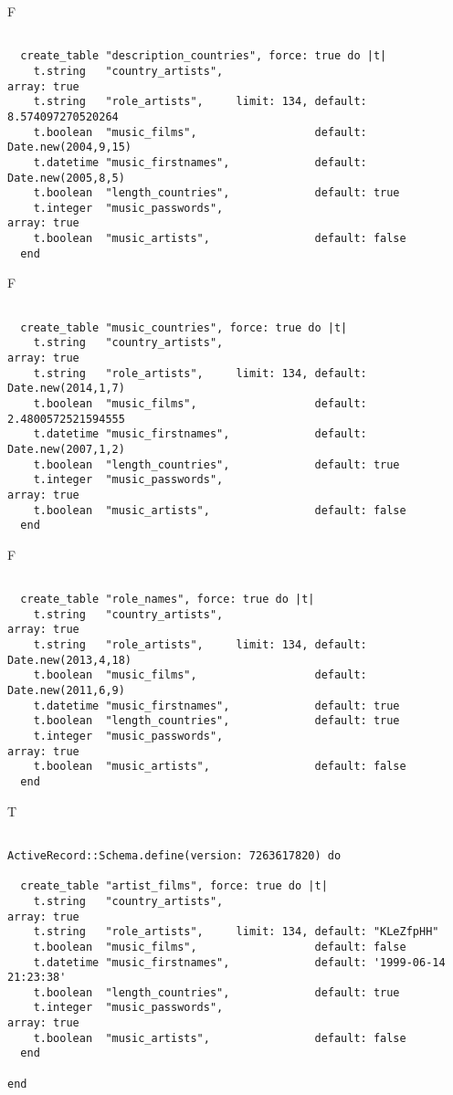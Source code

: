 F
\begin{verbatim}

  create_table "description_countries", force: true do |t|
    t.string   "country_artists",                                              array: true
    t.string   "role_artists",     limit: 134, default: 8.574097270520264
    t.boolean  "music_films",                  default: Date.new(2004,9,15)
    t.datetime "music_firstnames",             default: Date.new(2005,8,5)
    t.boolean  "length_countries",             default: true
    t.integer  "music_passwords",                                              array: true
    t.boolean  "music_artists",                default: false
  end

\end{verbatim}

F
\begin{verbatim}

  create_table "music_countries", force: true do |t|
    t.string   "country_artists",                                              array: true
    t.string   "role_artists",     limit: 134, default: Date.new(2014,1,7)
    t.boolean  "music_films",                  default: 2.4800572521594555
    t.datetime "music_firstnames",             default: Date.new(2007,1,2)
    t.boolean  "length_countries",             default: true
    t.integer  "music_passwords",                                              array: true
    t.boolean  "music_artists",                default: false
  end

\end{verbatim}

F
\begin{verbatim}

  create_table "role_names", force: true do |t|
    t.string   "country_artists",                                              array: true
    t.string   "role_artists",     limit: 134, default: Date.new(2013,4,18)
    t.boolean  "music_films",                  default: Date.new(2011,6,9)
    t.datetime "music_firstnames",             default: true
    t.boolean  "length_countries",             default: true
    t.integer  "music_passwords",                                              array: true
    t.boolean  "music_artists",                default: false
  end

\end{verbatim}

T
\begin{verbatim}

ActiveRecord::Schema.define(version: 7263617820) do

  create_table "artist_films", force: true do |t|
    t.string   "country_artists",                                              array: true
    t.string   "role_artists",     limit: 134, default: "KLeZfpHH"
    t.boolean  "music_films",                  default: false
    t.datetime "music_firstnames",             default: '1999-06-14 21:23:38'
    t.boolean  "length_countries",             default: true
    t.integer  "music_passwords",                                              array: true
    t.boolean  "music_artists",                default: false
  end

end
\end{verbatim}

